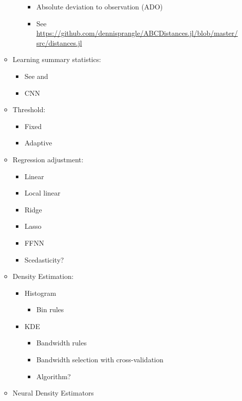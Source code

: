 \begin{enumerate}
\begin{itemize}
\begin{itemize}
\begin{itemize}
                \item Absolute deviation to observation (ADO)
                \item See \url{https://github.com/dennisprangle/ABCDistances.jl/blob/master/src/distances.jl}
            \end{itemize}
        \end{itemize}
        \item Learning summary statistics:
        \begin{itemize}
            \item See  and  
            \item CNN 
        \end{itemize}
        \item Threshold:
        \begin{itemize}
            \item Fixed
            \item Adaptive
        \end{itemize}
        \item Regression adjustment:
        \begin{itemize}
            \item Linear
            \item Local linear
            \item Ridge
            \item Lasso 
            \item FFNN
            \item Scedasticity? 
        \end{itemize}
        \item Density Estimation:
        \begin{itemize}
            \item Histogram
            \begin{itemize}
                \item Bin rules
            \end{itemize}
            \item KDE
            \begin{itemize}
                \item Bandwidth rules
                \item Bandwidth selection with cross-validation
                \item Algorithm?
            \end{itemize}
        \end{itemize}
        \item Neural Density Estimators

\end{itemize}
\end{enumerate}
